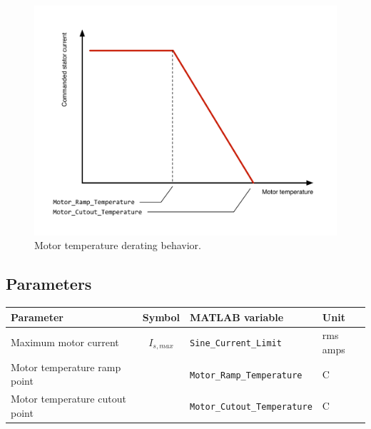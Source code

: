 \documentclass[../SimBALink.tex]{subfiles}
\begin{document}
			\begin{figure}[h]
				\centering
				\includegraphics[width=\linewidth]{motor_controller_temp_derating}
				\caption{Motor temperature derating behavior.}
				\label{fig:motor_controller_temp_derating}
			\end{figure}
			\FloatBarrier
			
\subsection{Parameters}
	
	\renewcommand{\arraystretch}{1.5}
	\begin{tabular}{ p{5cm} | c | l | l }
		Parameter					&	Symbol				&	MATLAB variable						&	Unit						\\\hline	
		Maximum motor current			&	$I_{s,max}$			&	\texttt{Sine\_Current\_Limit}				&	rms amps					\\
		Motor temperature ramp point		&						&	\texttt{Motor\_Ramp\_Temperature}		&	\degree C						\\
		Motor temperature cutout point	&						&	\texttt{Motor\_Cutout\_Temperature}		&	\degree C			
	\end{tabular}
\end{document}
